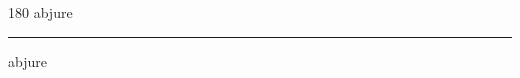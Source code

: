 
\begin{frame}
\begin{center}
\begin{turn}{180}
{\fontsize{2.5cm}{1em}\selectfont abjure}
\end{turn}
\vspace{1em}\par  
\hrule
\vspace{1em}\par  
{\fontsize{2.5cm}{1em}\selectfont abjure}
\end{center}
\end{frame}

